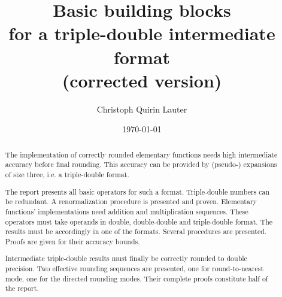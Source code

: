 \documentclass[a4paper,10pt,twoside]{article}
\title{Basic building blocks\\for a triple-double intermediate format\\{\small (corrected version)}}
\author{Christoph Quirin Lauter}
\date{\today}
\begin{document}
\maketitle

\begin{abstract}
The implementation of correctly rounded elementary functions needs high
intermediate accuracy before final rounding. This accuracy can be provided by (pseudo-)
expansions of size three, i.e. a triple-double format.

The report presents all basic operators for such a format. Triple-double numbers can be
redundant. A renormalization procedure is presented and proven. Elementary functions'
implementations need addition and multiplication sequences. These operators must take
operands in double, double-double and triple-double format. The results must be accordingly
in one of the formats. Several procedures are presented. Proofs are given for their
accuracy bounds.

Intermediate triple-double results must finally be correctly rounded to double precision.
Two effective rounding sequences are presented, one for round-to-nearest mode, one for
the directed rounding modes. Their complete proofs constitute half of the report.
\end{abstract}
\end{document}
